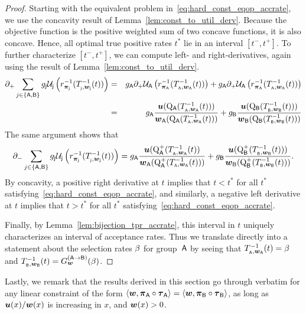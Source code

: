 		\begin{proof}  Starting with the equivalent problem in~\eqref{eq:hard_const_eqop_accrate}, we use the concavity result of Lemma~\ref{lem:const_to_util_derv}. Because the objective function is the positive weighted sum of two concave functions, it is also concave. Hence, all optimal true positive rates $t^*$ lie in an interval $[t^-,t^+]$. To further characterize $[t^-,t^+]$, we can compute left- and right-derivatives, again using the result of Lemma~\ref{lem:const_to_util_derv}.
		\begin{eqnarray*}
		\partial_+ \sum_{j \in \pops}\fracj \Util\supj\left(\ratef_{\distj}^{-1}(\constfj^{-1}(t))\right) &=& 
		\fraca \partial_+\Util\supa\left(\ratef_{\dista}^{-1}(\constfa^{-1}(t))\right) + \fraca \partial_+\Util\supa\left(\ratef_{\dista}^{-1}(\constfa^{-1}(t))\right)\\
		&=& \fraca\frac{\util(\RCDF\supa(\constfa^{-1}(t)))}{\boldwa(\RCDF\supa(\constfa^{-1}(t)))} + \fracb\frac{\util(\RCDF\supb(\constfb^{-1}(t)))}{\boldwb(\RCDF\supb(\constfb^{-1}(t)))}
		\end{eqnarray*}
		The same argument shows that 
		\begin{eqnarray*}
		\partial_- \sum_{j \in \pops}\fracj \Util\supj\left(\ratef_{\distj}^{-1}(\constfj^{-1}(t))\right) = \fraca\frac{\util(\RCDFpl\supa(\constfa^{-1}(t))}{\boldwa(\RCDFpl\supa(\constfa^{-1}(t)))} + \fracb\frac{\util(\RCDFpl\supb(\constfb^{-1}(t)))}{\boldwb(\RCDFpl\supb(\constfb^{-1}(t)))}.	
		\end{eqnarray*} 
		By concavity, a positive right derivative at $t$ implies that $t <  t^*$ for all $t^*$ satisfying~\eqref{eq:hard_const_eqop_accrate}, and similarly, a negative left derivative at $t$ implies that $t >  t^*$ for all $t^*$ satisfying~\eqref{eq:hard_const_eqop_accrate}.

		Finally, by Lemma~\ref{lem:bijection_tpr_accrate}, this interval in $t$ uniquely characterizes an interval of acceptance rates. Thus we translate directly into a statement about the selection rates $\accrate$ for group~$\popa$ by seeing that $\constfa^{-1}(t)=\accrate$ and $\constfb^{-1}(t) = \transfer_{\boldw}(\accrate)$. %
		\end{proof}


		Lastly, we remark that the results derived in this section go through verbatim for any linear constraint of the form $\langle \boldw, \dista \circ \pola \rangle = \langle \boldw, \distb \circ \polb \rangle$, as long as $\util(x)/\boldw(x)$ is increasing in $x$, and $\boldw(x) > 0$. 
		
